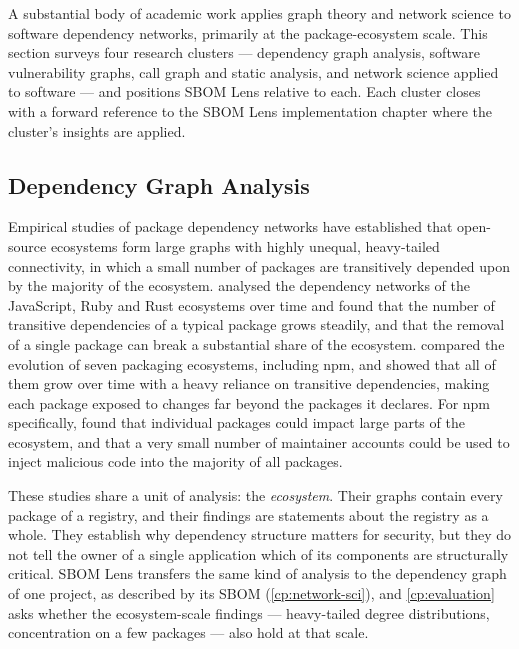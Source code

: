 A substantial body of academic work applies graph theory and network science to software dependency networks, primarily at the package-ecosystem scale. This section surveys four research clusters --- dependency graph analysis, software vulnerability graphs, call graph and static analysis, and network science applied to software --- and positions SBOM Lens relative to each. Each cluster closes with a forward reference to the SBOM Lens implementation chapter where the cluster's insights are applied.


\subsection{Dependency Graph Analysis}
\label{sec:rw-dependency-graphs}

Empirical studies of package dependency networks have established that open-source ecosystems form large graphs with highly unequal, heavy-tailed connectivity, in which a small number of packages are transitively depended upon by the majority of the ecosystem. \citet{Kikas2017} analysed the dependency networks of the JavaScript, Ruby and Rust ecosystems over time and found that the number of transitive dependencies of a typical package grows steadily, and that the removal of a single package can break a substantial share of the ecosystem. \citet{Decan2019} compared the evolution of seven packaging ecosystems, including npm, and showed that all of them grow over time with a heavy reliance on transitive dependencies, making each package exposed to changes far beyond the packages it declares. For npm specifically, \citet{Zimmermann2019} found that individual packages could impact large parts of the ecosystem, and that a very small number of maintainer accounts could be used to inject malicious code into the majority of all packages.

These studies share a unit of analysis: the \emph{ecosystem}. Their graphs contain every package of a registry, and their findings are statements about the registry as a whole. They establish why dependency structure matters for security, but they do not tell the owner of a single application which of its components are structurally critical. SBOM Lens transfers the same kind of analysis to the dependency graph of one project, as described by its SBOM (\autoref{cp:network-sci}), and \autoref{cp:evaluation} asks whether the ecosystem-scale findings --- heavy-tailed degree distributions, concentration on a few packages --- also hold at that scale.


